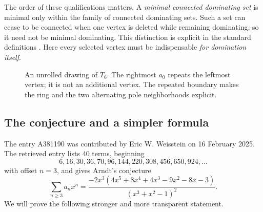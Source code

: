 \documentclass[11pt,letterpaper]{article}
\numberwithin{equation}{section}
\theoremstyle{definition}
\newcommand{\1}{\mathbf 1}
\begin{document}
The order of these qualifications matters. A \emph{minimal connected dominating
set} is minimal only within the family of connected dominating sets. Such a
set can cease to be connected when one vertex is deleted while remaining
dominating, so it need not be minimal dominating. This distinction is explicit
in the standard definitions \cite{minimal,connectedminimal}. Here every
selected vertex must be indispensable \emph{for domination itself}.

\begin{figure}[ht]
\centering
{}
\caption{An unrolled drawing of $T_6$. The rightmost $a_0$ repeats the leftmost
vertex; it is not an additional vertex. The repeated boundary makes the ring
and the two alternating pole neighborhoods explicit.}
\label{fig:graph}
\end{figure}

\subsection{The conjecture and a simpler formula}
The entry A381190 was contributed by Eric W. Weisstein on 16 February 2025.
The retrieved entry lists 40 terms, beginning
\[
6,16,30,36,70,96,144,220,308,456,650,924,\ldots
\]
with offset $n=3$, and gives Arndt's conjecture \cite{A381190}
\begin{equation}\label{eq:conjecture}
 \sum_{n\ge3}a_nx^n
 =\frac{-2x^3(4x^5+8x^4+4x^3-9x^2-8x-3)}{(x^3+x^2-1)^2}.
\end{equation}
We will prove the following stronger and more transparent statement.
\end{document}
